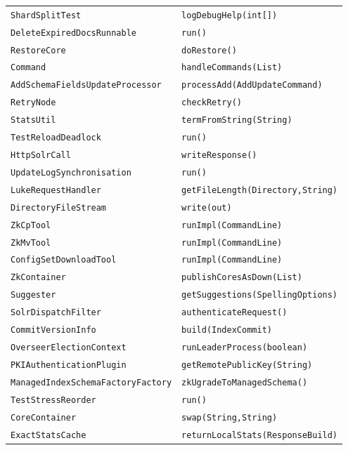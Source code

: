 \begin{center}
\begin{longtable}{ll}
\lstinline/ShardSplitTest/&{\lstinline/logDebugHelp(int[])/}\\
\lstinline/DeleteExpiredDocsRunnable/&{\lstinline/run()/}\\
\lstinline/RestoreCore/&{\lstinline/doRestore()/}\\
\lstinline/Command/&{\lstinline/handleCommands(List)/}\\
\lstinline/AddSchemaFieldsUpdateProcessor/&{\lstinline/processAdd(AddUpdateCommand)/}\\
\lstinline/RetryNode/&{\lstinline/checkRetry()/}\\
\lstinline/StatsUtil/&{\lstinline/termFromString(String)/}\\
\lstinline/TestReloadDeadlock/&{\lstinline/run()/}\\
\lstinline/HttpSolrCall/&{\lstinline/writeResponse()/}\\
\lstinline/UpdateLogSynchronisation/&{\lstinline/run()/}\\
\lstinline/LukeRequestHandler/&{\lstinline/getFileLength(Directory,String)/}\\
\lstinline/DirectoryFileStream/&{\lstinline/write(out)/}\\
\lstinline/ZkCpTool/&{\lstinline/runImpl(CommandLine)/}\\
\lstinline/ZkMvTool/&{\lstinline/runImpl(CommandLine)/}\\
\lstinline/ConfigSetDownloadTool/&{\lstinline/runImpl(CommandLine)/}\\
\lstinline/ZkContainer/&{\lstinline/publishCoresAsDown(List)/}\\
\lstinline/Suggester/&{\lstinline/getSuggestions(SpellingOptions)/}\\
\lstinline/SolrDispatchFilter/&{\lstinline/authenticateRequest()/}\\
\lstinline/CommitVersionInfo/&{\lstinline/build(IndexCommit)/}\\
\lstinline/OverseerElectionContext/&{\lstinline/runLeaderProcess(boolean)/}\\
\lstinline/PKIAuthenticationPlugin/&{\lstinline/getRemotePublicKey(String)/}\\
\lstinline/ManagedIndexSchemaFactoryFactory/&{\lstinline/zkUgradeToManagedSchema()/}\\
\lstinline/TestStressReorder/&{\lstinline/run()/}\\
\lstinline/CoreContainer/&{\lstinline/swap(String,String)/}\\
\lstinline/ExactStatsCache/&{\lstinline/returnLocalStats(ResponseBuild)/}\\

\end{longtable}
\end{center}
